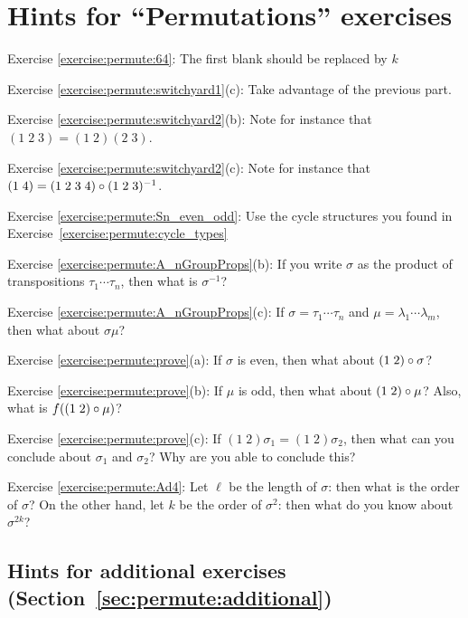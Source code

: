 \section{Hints for ``Permutations'' exercises}\label{sec:permute:hints} 

\noindent Exercise \ref{exercise:permute:64}: The first blank should be replaced by $k$

\noindent Exercise \ref{exercise:permute:switchyard1}(c): Take advantage of the previous part.

\noindent Exercise \ref{exercise:permute:switchyard2}(b): Note for instance that $(1 \;2 \; 3) = (1 \; 2) (2 \; 3)$.

\noindent Exercise \ref{exercise:permute:switchyard2}(c): Note for instance that $(1 \;4 ) = (1 \; 2 \; 3 \; 4) \circ (1 \; 2 \; 3 )^{-1}$.

\noindent Exercise \ref{exercise:permute:Sn_even_odd}: Use the cycle structures you found in Exercise~\ref{exercise:permute:cycle_types}


\noindent Exercise \ref{exercise:permute:A_nGroupProps}(b): If you write $\sigma$ as the product of transpositions $\tau_1 \cdots \tau_{n}$, then what is $\sigma^{-1}$?

\noindent Exercise \ref{exercise:permute:A_nGroupProps}(c): If $\sigma = \tau_1 \cdots \tau_{n}$ and $\mu = \lambda_1 \cdots \lambda_{m}$, then what about $\sigma \mu$?

\noindent Exercise \ref{exercise:permute:prove}(a): If $\sigma$ is even, then what about $(1 \; 2) \circ \sigma$?

\noindent Exercise \ref{exercise:permute:prove}(b): If $\mu$ is odd, then what about $(1 \; 2) \circ \mu$? Also, what is $f( (1 \; 2) \circ \mu )$?

\noindent Exercise \ref{exercise:permute:prove}(c): If $(1 \; 2) \sigma_1 = (1 \; 2) \sigma_2$, then what can you conclude about $\sigma_1$ and $\sigma_2$? Why are you able to conclude this?


\noindent Exercise \ref{exercise:permute:Ad4}: Let $\ell$ be the length of $\sigma$: then what is the order of $\sigma$? On the other hand, let $k$ be the order of $\sigma^2$: then what do you know about $\sigma^{2k}$?


\bigskip

\subsection{Hints for additional exercises (Section~\ref{sec:permute:additional})}

